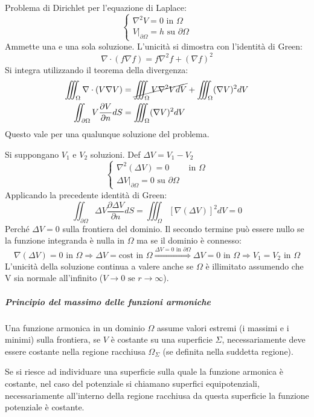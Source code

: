 Problema di Dirichlet per l'equazione di Laplace:
$$
\begin{cases}
\nabla^2 V = 0 \text{ in } \Omega\\
\left.V\right|_{\partial\Omega} = h \text{ su } \partial\Omega
\end{cases}
$$
Ammette una e una sola soluzione.
L'unicità si dimostra con l'identità di Green:
$$
\nabla\cdot(f\nabla f) = f\nabla^2f + (\nabla f)^2
$$
Si integra utilizzando il teorema della divergenza:
$$
\begin{aligned}
\iiint_\Omega \nabla\cdot(V\nabla V) &= \cancel{\iiint_\Omega V\nabla^2 V dV} + \iiint_\Omega (\nabla V)^2 dV\\
\iint_{\partial\Omega} V \frac{\partial V}{\partial n}dS &= \iiint_\Omega (\nabla V)^2 dV
\end{aligned}
$$
Questo vale per una qualunque soluzione del problema.

Si suppongano $V_1$ e $V_2$ soluzioni. Def $\Delta V = V_1 - V_2$ 
$$
\begin{cases}
\nabla^2 (\Delta V) = 0 & \text{ in }\Omega \\
\left.\Delta V\right|_{\partial \Omega} = 0 \text{ su } \partial \Omega
\end{cases}
$$
Applicando la precedente identità di Green:
$$
\iint_{\partial \Omega} \Delta V \frac{\partial \Delta V}{\partial n} dS =
\iiint_\Omega \left[\nabla(\Delta V)\right]^2 dV = 0
$$
Perché $\Delta V = 0$ sulla frontiera del dominio.
Il secondo termine può essere nullo se la funzione integranda è nulla in $\Omega$ ma se il dominio
è connesso:
$$
\nabla(\Delta V) = 0 \text{ in } \Omega \Rightarrow \Delta V = \text{cost in } \Omega \stackrel{\Delta V = 0 \text{ in }\partial\Omega}{\Rightarrow}
\Delta V = 0 \text{ in } \Omega \Rightarrow V_1 = V_2 \text{ in } \Omega
$$
L'unicità della soluzione continua a valere anche se $\Omega$ è illimitato assumendo che V sia 
normale all'infinito ($V \to 0 \text{ se } r \to \infty$).

\subparagraph{Principio del massimo delle funzioni armoniche}
Una funzione armonica in un dominio $\Omega$ assume valori estremi (i massimi e i minimi) sulla
frontiera, se $V$ è costante su una superficie $\Sigma$, necessariamente deve essere costante
nella regione racchiusa $\Omega_\Sigma$ (se definita nella suddetta regione).

Se si riesce ad individuare una superficie sulla quale la funzione armonica è costante, nel caso
del potenziale si chiamano superfici equipotenziali, necessariamente all'interno della regione
racchiusa da questa superficie la funzione potenziale è costante.

